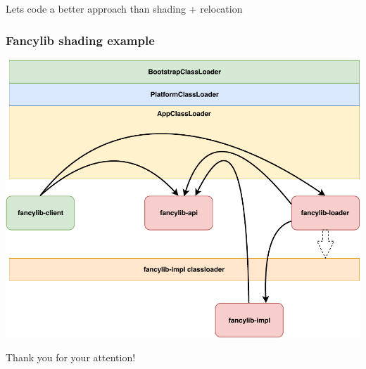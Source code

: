 \documentclass[aspectratio=169]{beamer}
\begin{document}
\begin{frame}
    \begin{center}
    Lets code a better approach than shading + relocation
    \end{center}
\end{frame}

\begin{frame}
	\frametitle{Fancylib shading example}
	\begin{center}
	    \includegraphics[scale=0.45]{assets/AllGraphicsTalk-shading.pdf}
	\end{center}
\end{frame}

\begin{frame}

    \begin{center}
        Thank you for your attention!
    \end{center}

\end{frame}
\end{document}
